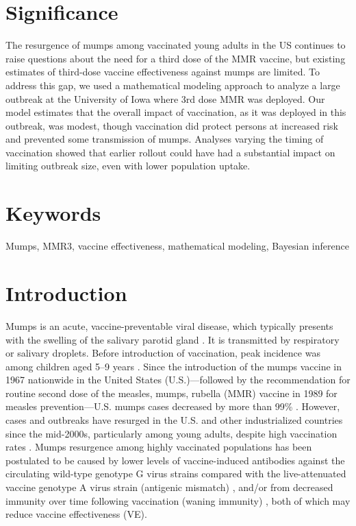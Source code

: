 \documentclass[12pt]{article}
\begin{document}
\section*{Significance}
The resurgence of mumps among vaccinated young adults in the US continues to raise questions about the need for a third dose of the MMR vaccine, but existing estimates of third-dose vaccine effectiveness against mumps are limited.
To address this gap, we used a mathematical modeling approach to analyze a large outbreak at the University of Iowa where 3rd dose MMR was deployed. 
Our model estimates that the overall impact of vaccination, as it was deployed in this outbreak, was modest, though vaccination did protect persons at increased risk and prevented some transmission of mumps. 
Analyses varying the timing of vaccination showed that earlier rollout could have had a substantial impact on limiting outbreak size, even with lower population uptake.

\section*{Keywords}
Mumps, MMR3, vaccine effectiveness, mathematical modeling, Bayesian inference

\pagebreak

\section{Introduction}

Mumps is an acute, vaccine-preventable viral disease, which typically presents with the swelling of the salivary parotid gland \citep{hviid2008mumps}.
It is transmitted by respiratory or salivary droplets.
Before introduction of vaccination, peak incidence was among children aged 5–9 years \citep{galazka1999mumps}.
Since the introduction of the mumps vaccine in 1967 nationwide in the United States (U.S.)---followed by the recommendation for routine second dose of the measles, mumps, rubella (MMR) vaccine in 1989 for measles prevention---U.S. mumps cases decreased by more than 99\% \citep{mclean2013prevention}.
However, cases and outbreaks have resurged in the U.S. \citep{ogbuanu2012impact,nelson2013epidemiology,cardemil2017effectiveness,wohl2020combining,lo2021influenza} and other industrialized countries since the mid-2000s, particularly among young adults, despite high vaccination rates \citep{aasheim2014outbreak,vygen2016waning}.
Mumps resurgence among highly vaccinated populations has been postulated to be caused by lower levels of vaccine-induced antibodies against the circulating wild-type genotype G virus strains compared with the live-attenuated vaccine genotype A virus strain (antigenic mismatch) \citep{peltola2007mumps,rubin2008antibody}, and/or from decreased immunity over time following vaccination (waning immunity) \citep{lewnard2018vaccine,seagle2018measles,gokhale2023disentangling}, both of which may reduce vaccine effectiveness (VE).
\end{document}
